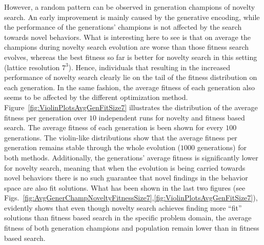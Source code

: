 However, a random pattern can be observed in generation champions of novelty search. An early improvement is mainly caused by the generative encoding, while the performance of the generations' champions is not affected by the search towards novel behaviors. What is interesting here to see is that on average the champions during novelty search evolution are worse than those fitness search evolves, whereas the best fitness so far is better for novelty search in this setting (lattice resolution $7^3$). Hence, individuals that resulting in the increased performance of novelty search clearly lie on the tail of the fitness distribution on each generation. In the same fashion, the average fitness of each generation also seems to be affected by the different optimization method. Figure~\ref{fig:ViolinPlotsAvgGenFitSize7} illustrates the distribution of the average fitness per generation over $10$ independent runs for novelty and fitness based search. The average fitness of each generation is been shown for every $100$ generations. The violin-like distributions show that the average fitness per generation remains stable through the whole evolution ($1000$ generations) for both methods. Additionally, the generations' average fitness is significantly lower for novelty search, meaning that when the evolution is being carried towards novel behaviors there is no such guarantee that novel findings in the behavior space are also  fit solutions. What has been shown in the last two figures (see Figs.~\ref{fig:AvgGenerChampNoveltyFitnessSize7},\ref{fig:ViolinPlotsAvgGenFitSize7}), evidently shows that even though novelty search achieves finding more ``fit'' solutions than fitness based search in the specific problem domain, the average fitness of both generation champions and population remain lower than in fitness based search.



